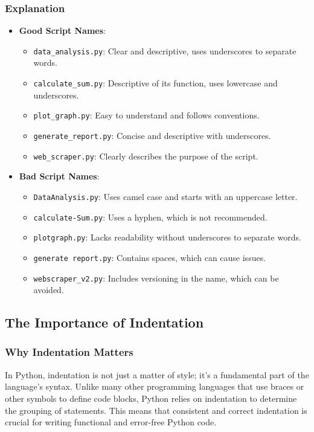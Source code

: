 \subsubsection{Explanation}

\begin{itemize}
    \item \textbf{Good Script Names}: 
        \begin{itemize}
            \item \texttt{data\_analysis.py}: Clear and descriptive, uses underscores to separate words.
            \item \texttt{calculate\_sum.py}: Descriptive of its function, uses lowercase and underscores.
            \item \texttt{plot\_graph.py}: Easy to understand and follows conventions.
            \item \texttt{generate\_report.py}: Concise and descriptive with underscores.
            \item \texttt{web\_scraper.py}: Clearly describes the purpose of the script.
        \end{itemize}
    
    \item \textbf{Bad Script Names}: 
        \begin{itemize}
            \item \texttt{DataAnalysis.py}: Uses camel case and starts with an uppercase letter.
            \item \texttt{calculate-Sum.py}: Uses a hyphen, which is not recommended.
            \item \texttt{plotgraph.py}: Lacks readability without underscores to separate words.
            \item \texttt{generate report.py}: Contains spaces, which can cause issues.
            \item \texttt{webscraper\_v2.py}: Includes versioning in the name, which can be avoided.
        \end{itemize}
\end{itemize}

\subsection{The Importance of Indentation}

\subsubsection{Why Indentation Matters}
In Python, indentation is not just a matter of style; it's a fundamental part of the language's syntax. Unlike many other programming languages that use braces or other symbols to define code blocks, Python relies on indentation to determine the grouping of statements. This means that consistent and correct indentation is crucial for writing functional and error-free Python code.

